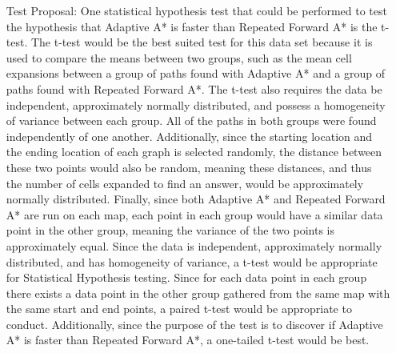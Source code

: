 \documentclass{article}
\begin{document}
\begin{enumerate}
\begin{enumerate}
            \item[Test Proposal:] One statistical hypothesis test that could be performed to test the hypothesis that Adaptive A* is faster than Repeated Forward A* is the t-test. The t-test would be the best suited test for this data set because it is used to compare the means between two groups, such as the mean cell expansions between a group of paths found with Adaptive A* and a group of paths found with Repeated Forward A*. The t-test also requires the data be independent, approximately normally distributed, and possess a homogeneity of variance between each group. All of the paths in both groups were found independently of one another. Additionally, since the starting location and the ending location of each graph is selected randomly, the distance between these two points would also be random, meaning these distances, and thus the number of cells expanded to find an answer, would be approximately normally distributed. Finally, since both Adaptive A* and Repeated Forward A* are run on each map, each point in each group would have a similar data point in the other group, meaning the variance of the two points is approximately equal. Since the data is independent, approximately normally distributed, and has homogeneity of variance, a t-test would be appropriate for Statistical Hypothesis testing. Since for each data point in each group there exists a data point in the other group gathered from the same map with the same start and end points, a paired t-test would be appropriate to conduct. Additionally, since the purpose of the test is to discover if Adaptive A* is faster than Repeated Forward A*, a one-tailed t-test would be best. 
        \end{enumerate}
    \end{enumerate}
\end{document}
